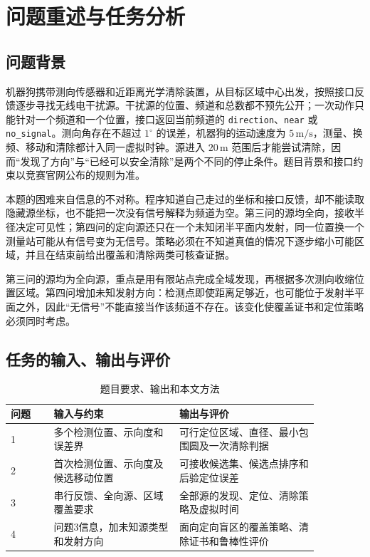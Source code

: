 \section{问题重述与任务分析}
\subsection{问题背景}
机器狗携带测向传感器和近距离光学清除装置，从目标区域中心出发，按照接口反馈逐步寻找无线电干扰源。干扰源的位置、频道和总数都不预先公开；一次动作只能针对一个频道和一个位置，接口返回当前频道的 \texttt{direction}、\texttt{near} 或 \texttt{no\_signal}。测向角存在不超过 $1^\circ$ 的误差，机器狗的运动速度为 $5\,\mathrm{m/s}$，测量、换频、移动和清除都计入同一虚拟时钟。源进入 $20\,\mathrm m$ 范围后才能尝试清除，因而“发现了方向”与“已经可以安全清除”是两个不同的停止条件。题目背景和接口约束以竞赛官网公布的规则为准\cite{cumcm}。

本题的困难来自信息的不对称。程序知道自己走过的坐标和接口反馈，却不能读取隐藏源坐标，也不能把一次没有信号解释为频道为空。第三问的源均全向，接收半径决定可见性；第四问的定向源还只在一个未知闭半平面内发射，同一位置换一个测量站可能从有信号变为无信号。策略必须在不知道真值的情况下逐步缩小可能区域，并且在结束前给出覆盖和清除两类可核查证据。

第三问的源均为全向源，重点是用有限站点完成全域发现，再根据多次测向收缩位置区域。第四问增加未知发射方向：检测点即使距离足够近，也可能位于发射半平面之外，因此“无信号”不能直接当作该频道不存在。该变化使覆盖证书和定位策略必须同时考虑。

\subsection{任务的输入、输出与评价}
\begin{table}[H]\centering\small
\caption{题目要求、输出和本文方法}\label{tab:q1-tasks}
\begin{tabular}{p{0.12\linewidth}p{0.35\linewidth}p{0.39\linewidth}}
\toprule
问题 & 输入与约束 & 输出与评价 \\
\midrule
1 & 多个检测位置、示向度和误差界 & 可行定位区域、直径、最小包围圆及一次清除判据 \\
2 & 首次检测位置、示向度及候选移动位置 & 可接收候选集、候选点排序和后验定位误差 \\
3 & 串行反馈、全向源、区域覆盖要求 & 全部源的发现、定位、清除策略及虚拟时间 \\
4 & 问题3信息，加未知源类型和发射方向 & 面向定向盲区的覆盖策略、清除证书和鲁棒性评价 \\
\bottomrule
\end{tabular}
\end{table}

